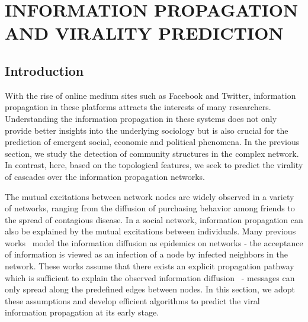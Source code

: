 \chapter{INFORMATION PROPAGATION AND VIRALITY PREDICTION} \label{sec:2}

\let\thefootnote\relax{}
\let\thefootnote\relax{}
\let\thefootnote\relax{}
\let\thefootnote\relax{}


\section{Introduction}
With the rise of online medium sites such as Facebook and Twitter, information propagation in these platforms attracts the interests of many researchers. Understanding the information propagation in these systems does not only provide better insights into the underlying sociology but is also crucial for the prediction of emergent social, economic and political phenomena. In the previous section, we study the detection of community structures in the complex network. In contrast, here, based on the topological features, we seek to predict the virality of cascades over the information propagation networks.

The mutual excitations between network nodes are widely observed in a variety of networks, ranging from the diffusion of purchasing behavior among friends to the spread of contagious disease. In a social network, information propagation can also be explained by the mutual excitations between individuals. Many previous works~\cite{weng2014predicting,zhao2015seismic,guille2012predictive} model the information diffusion as epidemics on networks - the acceptance of information is viewed as an infection of a node by infected neighbors in the network. These works assume that there exists an explicit propagation pathway which is sufficient to explain the observed information diffusion~\cite{yang2015defining} - messages can only spread along the predefined edges between nodes. In this section, we adopt these assumptions and develop efficient algorithms to predict the viral information propagation at its early stage.


